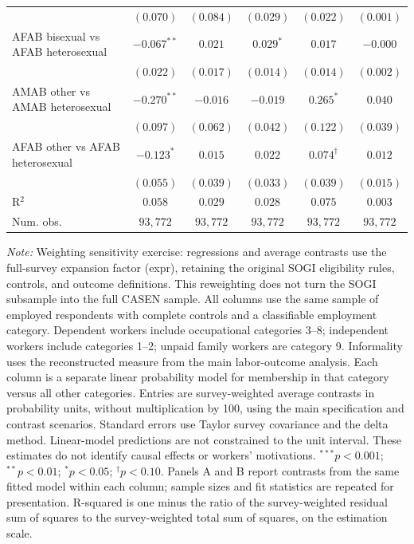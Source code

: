 \begin{table}[htpb!]
{\begin{tabular}{l c c c c c}
 & $(0.070)$ & $(0.084)$ & $(0.029)$ & $(0.022)$ & $(0.001)$ \\
AFAB bisexual vs AFAB heterosexual & $-0.067^{**}$ & $0.021$ & $0.029^{*}$ & $0.017$ & $-0.000$ \\
 & $(0.022)$ & $(0.017)$ & $(0.014)$ & $(0.014)$ & $(0.002)$ \\
AMAB other vs AMAB heterosexual & $-0.270^{**}$ & $-0.016$ & $-0.019$ & $0.265^{*}$ & $0.040$ \\
 & $(0.097)$ & $(0.062)$ & $(0.042)$ & $(0.122)$ & $(0.039)$ \\
AFAB other vs AFAB heterosexual & $-0.123^{*}$ & $0.015$ & $0.022$ & $0.074^{\dagger}$ & $0.012$ \\
 & $(0.055)$ & $(0.039)$ & $(0.033)$ & $(0.039)$ & $(0.015)$ \\
\hline
R$^2$ & $0.058$ & $0.029$ & $0.028$ & $0.075$ & $0.003$ \\
Num. obs. & $93,772$ & $93,772$ & $93,772$ & $93,772$ & $93,772$ \\
\hline
\end{tabular}%
}
\par\vspace{1ex}
\begin{minipage}{\textwidth}\footnotesize\raggedright
\textit{Note:} Weighting sensitivity exercise: regressions and average contrasts use the full-survey expansion factor (expr), retaining the original SOGI eligibility rules, controls, and outcome definitions. This reweighting does not turn the SOGI subsample into the full CASEN sample. All columns use the same sample of employed respondents with complete controls and a classifiable employment category. Dependent workers include occupational categories 3--8; independent workers include categories 1--2; unpaid family workers are category 9. Informality uses the reconstructed measure from the main labor-outcome analysis. Each column is a separate linear probability model for membership in that category versus all other categories. Entries are survey-weighted average contrasts in probability units, without multiplication by 100, using the main specification and contrast scenarios. Standard errors use Taylor survey covariance and the delta method. Linear-model predictions are not constrained to the unit interval. These estimates do not identify causal effects or workers' motivations. $^{***}p<0.001$; $^{**}p<0.01$; $^{*}p<0.05$; $^{\dagger}p<0.10$. Panels A and B report contrasts from the same fitted model within each column; sample sizes and fit statistics are repeated for presentation. R-squared is one minus the ratio of the survey-weighted residual sum of squares to the survey-weighted total sum of squares, on the estimation scale.
\end{minipage}
\end{table}
